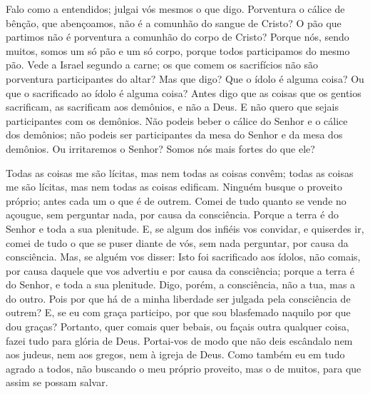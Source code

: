Falo como a entendidos; julgai vós mesmos o que digo.
Porventura o cálice de bênção, que abençoamos, não é a
comunhão do sangue de Cristo? O pão que partimos não é porventura a
comunhão do corpo de Cristo? Porque nós, sendo muitos, somos
um só pão e um só corpo, porque todos participamos do mesmo pão.
Vede a Israel segundo a carne; os que comem os sacrifícios
não são porventura participantes do altar? Mas que digo? Que
o ídolo é alguma coisa? Ou que o sacrificado ao ídolo é alguma
coisa? Antes digo que as coisas que os gentios sacrificam, as
sacrificam aos demônios, e não a Deus. E não quero que sejais
participantes com os demônios. Não podeis beber o cálice do
Senhor e o cálice dos demônios; não podeis ser participantes da mesa
do Senhor e da mesa dos demônios. Ou irritaremos o Senhor?
Somos nós mais fortes do que ele?

Todas as coisas me são lícitas, mas nem todas as coisas convêm;
todas as coisas me são lícitas, mas nem todas as coisas edificam.
Ninguém busque o proveito próprio; antes cada um o que é de
outrem. Comei de tudo quanto se vende no açougue, sem
perguntar nada, por causa da consciência. Porque a terra é do
Senhor e toda a sua plenitude. E, se algum dos infiéis vos
convidar, e quiserdes ir, comei de tudo o que se puser diante de
vós, sem nada perguntar, por causa da consciência. Mas, se
alguém vos disser: Isto foi sacrificado aos ídolos, não comais, por
causa daquele que vos advertiu e por causa da consciência; porque a
terra é do Senhor, e toda a sua plenitude. Digo, porém, a
consciência, não a tua, mas a do outro. Pois por que há de a minha
liberdade ser julgada pela consciência de outrem? E, se eu
com graça participo, por que sou blasfemado naquilo por que dou
graças? Portanto, quer comais quer bebais, ou façais outra
qualquer coisa, fazei tudo para glória de Deus. Portai-vos de
modo que não deis escândalo nem aos judeus, nem aos gregos, nem à
igreja de Deus. Como também eu em tudo agrado a todos, não
buscando o meu próprio proveito, mas o de muitos, para que assim se
possam salvar.

\medskip

